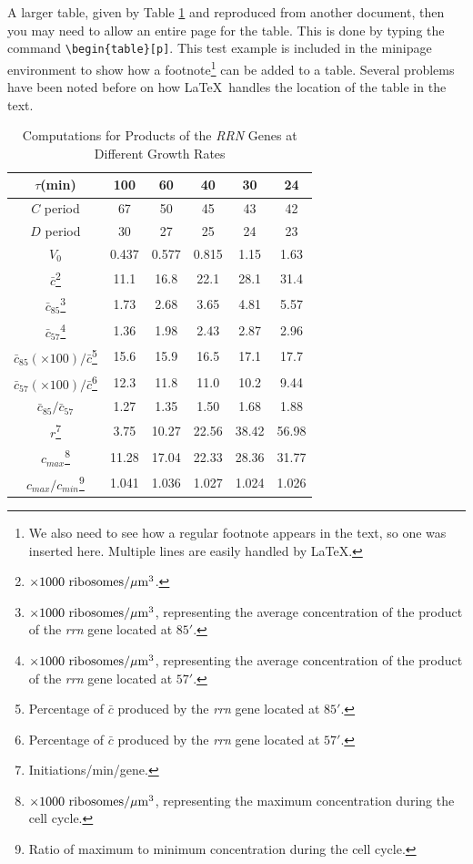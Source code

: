 A larger table, given by Table \ref{tab2} and reproduced from another
document, then you may need to allow an entire page for the
table. This is done by typing the command
\verb+\begin{table}[p]+. This test example is included in the
minipage environment to show how a footnote\footnote{We also need to
  see how a regular footnote appears in the text, so one was inserted
  here. Multiple lines are easily handled by \LaTeX.}  can be added to
a table.  Several problems have been noted before on how \LaTeX\
handles the location of the table in the text.
\begin{table}[p]
  \centering
  \begin{minipage}{3.7in}
    \caption{Computations for Products of the \emph{RRN} Genes at Different
      Growth Rates\label{tab2}}
    \begin{tabular}{|c||c|c|c|c|c||}	 \hline
      $\tau$(min)  &  100  &	60 & 40 & 30 & 24 \\ \hline \hline
      $C$ period & 67 & 50  & 45 & 43 & 42 \\ \hline
      $D$ period & 30 & 27  & 25 & 24 & 23 \\ \hline
      $V_0$ & 0.437 & 0.577 & 0.815 & 1.15 & 1.63 \\ \hline
      $\bar c$\footnote{$\times 1000\ {\rm ribosomes}/\mu{\rm m}^3$.}
      & 11.1 & 16.8 & 22.1 & 28.1 & 31.4 \\ \hline
      $\bar c_{85}$\footnote{$\times 1000\ {\rm ribosomes}/\mu{\rm m}^3$,
        representing the average concentration of the product of the
        \emph{rrn} gene located at $85'$.} & 1.73 & 2.68 & 3.65 & 4.81
      & 5.57 \\ \hline 
      $\bar c_{57}$\footnote{$\times 1000\ {\rm ribosomes}/\mu{\rm m}^3$,
        representing the average concentration of the product of the \emph{rrn} gene
        located at $57'$.} & 1.36 & 1.98 & 2.43 & 2.87 & 2.96 \\ \hline
      $\bar c_{85}({\scriptstyle\times 100})/\bar c$\footnote{Percentage of
        $\bar c$ produced by the \emph{rrn} gene located at $85'$.} & 15.6 & 15.9 &
      16.5 & 17.1 & 17.7 \\ \hline
      $\bar c_{57}({\scriptstyle\times 100})/\bar c$\footnote{Percentage of
        $\bar c$ produced by the \emph{rrn} gene located at $57'$.} & 12.3 & 11.8 &
      11.0 & 10.2 & 9.44 \\ \hline
      $\bar c_{85}/\bar c_{57}$ & 1.27 & 1.35 & 1.50 & 1.68 & 1.88 \\ \hline
      $r$\footnote{Initiations/min/gene.} & 3.75 & 10.27
      & 22.56 & 38.42 & 56.98 \\ \hline
      $c_{max}$\footnote{$\times 1000\ {\rm ribosomes}/\mu{\rm m}^3$, representing
        the maximum concentration during the cell cycle.} & 11.28 & 17.04
      & 22.33 & 28.36 & 31.77 \\ \hline
      $c_{max}/c_{min}$\footnote{Ratio of maximum to minimum concentration
        during the cell cycle.} & 1.041 & 1.036 & 1.027 & 1.024 & 1.026 \\ \hline
    \end{tabular}
  \end{minipage}
\end{table}

